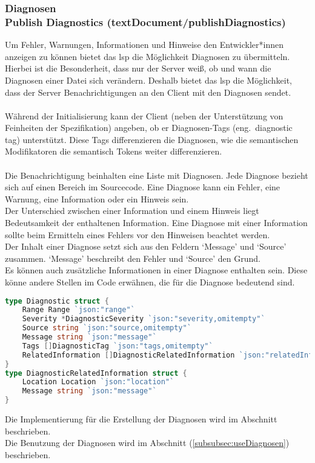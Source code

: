 \documentclass[./einleitung.tex]{subfiles}
\begin{document}
    \subsubsection[Diagnosen]{Diagnosen\\ {\textnormal{\footnotesize Publish Diagnostics (textDocument/publishDiagnostics) \cite{diagnostics}}}}\label{subsubsec:diagnostics}
    Um Fehler, Warnungen, Informationen und Hinweise den Entwickler*innen anzeigen zu können bietet das \acrshort{lsp} die Möglichkeit Diagnosen zu übermitteln.
    Hierbei ist die Besonderheit, dass nur der Server weiß, ob und wann die Diagnosen einer Datei sich verändern.
    Deshalb bietet das \acrshort{lsp} die Möglichkeit, dass der Server Benachrichtigungen an den Client mit den Diagnosen sendet.
    \\\\
    Während der Initialisierung kann der Client (neben der Unterstützung von Feinheiten der Spezifikation) angeben, ob er Diagnosen-Tags (eng.\ diagnostic tag) unterstützt.
    Diese Tags differenzieren die Diagnosen, wie die semantischen Modifikatoren die semantisch Tokens weiter differenzieren.
    \\\\
    Die Benachrichtigung beinhalten eine Liste mit Diagnosen.
    Jede Diagnose bezieht sich auf einen Bereich im Sourcecode.
    Eine Diagnose kann ein Fehler, eine Warnung, eine Information oder ein Hinweis sein.\\
    Der Unterschied zwischen einer Information und einem Hinweis liegt Bedeutsamkeit der enthaltenen Information.
    Eine Diagnose mit einer Information sollte beim Ermitteln eines Fehlers vor den Hinweisen beachtet werden.\\
    Der Inhalt einer Diagnose setzt sich aus den Feldern `Message' und `Source' zusammen.
    `Message' beschreibt den Fehler und `Source' den Grund.\\
    Es können auch zusätzliche Informationen in einer Diagnose enthalten sein.
    Diese könne andere Stellen im Code erwähnen, die für die Diagnose bedeutend sind.
    \begin{lstlisting}[language=Go, caption=Definition des Inhalts der Benachrichtigung, label=lst:diagnostics-result]
type Diagnostic struct {
	Range Range `json:"range"`
	Severity *DiagnosticSeverity `json:"severity,omitempty"`
  	Source string `json:"source,omitempty"`
	Message string `json:"message"`
	Tags []DiagnosticTag `json:"tags,omitempty"`
	RelatedInformation []DiagnosticRelatedInformation `json:"relatedInformation,omitempty"`
}
type DiagnosticRelatedInformation struct {
	Location Location `json:"location"`
	Message string `json:"message"`
}
    \end{lstlisting}
    Die Implementierung für die Erstellung der Diagnosen wird im Abschnitt  beschrieben.\\
    Die Benutzung der Diagnosen wird im Abschnitt  (\ref{subsubsec:useDiagnosen}) beschrieben.
\end{document}
